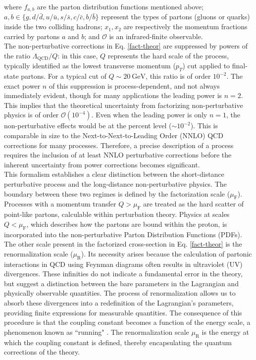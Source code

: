 \documentclass[a4paper, 12pt]{book}
\begin{document}
where $f_{a,b}$ are the parton distribution functions mentioned above; $a, b \in \{g, d/\bar{d}, u/\bar{u}, s/\bar{s}, c/\bar{c}, b/\bar{b} \}$  represent the types of partons (gluons or quarks) inside the two colliding hadrons; $x_1, x_2$ are respectively the momentum fractions carried by partons $a$ and $b$; and $\mathcal{O}$ is an infrared-finite observable. \\
The non-perturbative corrections in Eq. \ref{fact-theor} are suppressed by powers of the ratio $\Lambda_{\text{QCD}}/Q$: in this case, $Q$ represents the hard scale of the process, typically identified as the lowest transverse momentum ($p_T$) cut applied to final-state partons. For a typical cut of $Q \sim 20\ \text{GeV}$, this ratio is of order $10^{-2}$. The exact power $n$ of this suppression is process-dependent, and not always immediately evident, though for many applications the leading power is $n = 2$. This implies that the theoretical uncertainty from factorizing non-perturbative physics is of order $\mathcal{O}(10^{-4})$. Even when the leading power is only $n = 1$, the non-perturbative effects would be at the percent level ($\sim 10^{-2}$). This is comparable in size to the Next-to-Next-to-Leading Order (NNLO) QCD corrections for many processes. Therefore, a precise description of a process requires the inclusion of at least NNLO perturbative corrections before the inherent uncertainty from power corrections becomes significant.\\
This formalism establishes a clear distinction between the short-distance perturbative process and the long-distance non-perturbative physics. The boundary between these two regimes is defined by the factorization scale ($\mu_\text{F}$). Processes with a momentum transfer $Q > \mu_\text{F}$ are treated as the hard scatter of point-like partons, calculable within perturbation theory. Physics at scales $Q < \mu_\text{F}$, which describes how the partons are bound within the proton, is incorporated into the non-perturbative Parton Distribution Functions (PDFs). \\
The other scale present in the factorized cross-section in Eq. \ref{fact-theor} is the renormalization scale ($\mu_\text{R}$). Its necessity arises because the calculation of partonic interactions in QCD using Feynman diagrams often results in ultraviolet (UV) divergences. These infinities do not indicate a fundamental error in the theory, but suggest a distinction between the bare parameters in the Lagrangian and physically observable quantities. The process of renormalization allows us to absorb these divergences into a redefinition of the Lagrangian's parameters, providing finite expressions for measurable quantities. The consequence of this procedure is that the coupling constant becomes a function of the energy scale, a phenomenon known as ``running" \cite{ellis}. The renormalization scale $\mu_\text{R}$ is the energy at which the coupling constant is defined, thereby encapsulating the quantum corrections of the theory. \\
\end{document}
